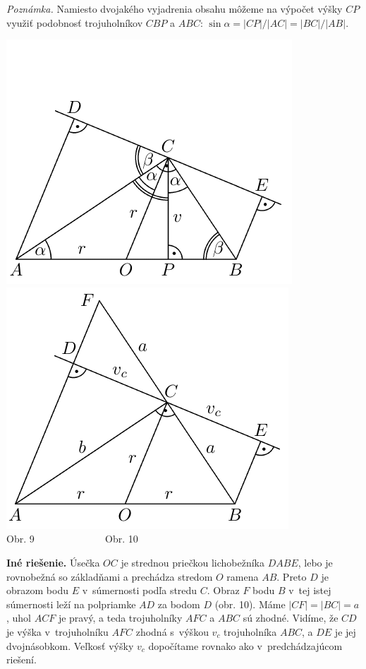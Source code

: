 \textit{Poznámka.} Namiesto dvojakého vyjadrenia obsahu môžeme na výpočet výšky $CP$ využiť podobnosť trojuholníkov $CBP$ a $ABC$: $\sin \alpha = |CP|/|AC| = |BC|/|AB|$.
\begin{center}
\includegraphics{obrazky/58D21} \includegraphics{obrazky/58D22}\\

Obr. 9 \ \ \  \ \ \ \ \ \ \hspace{80pt} \ \ \ \ Obr. 10
\end{center}
\textbf{Iné riešenie.} Úsečka $OC$ je strednou priečkou lichobežníka $DABE$, lebo je rovnobežná so základňami a prechádza stredom $O$ ramena $AB$. Preto $D$ je obrazom bodu $E$ v~súmernosti podľa stredu $C$. Obraz $F$ bodu $B$ v~tej istej súmernosti leží na polpriamke $AD$ za bodom $D$ (obr. 10). Máme $|CF| = |BC| = a$, uhol $ACF$ je pravý, a teda trojuholníky $AFC$ a $ABC$ sú zhodné. Vidíme, že $CD$ je výška v~trojuholníku $AFC$ zhodná s~výškou $v_c$ trojuholníka $ABC$, a $DE$ je jej dvojnásobkom. Veľkosť výšky $v_c$ dopočítame rovnako ako v~predchádzajúcom riešení.

